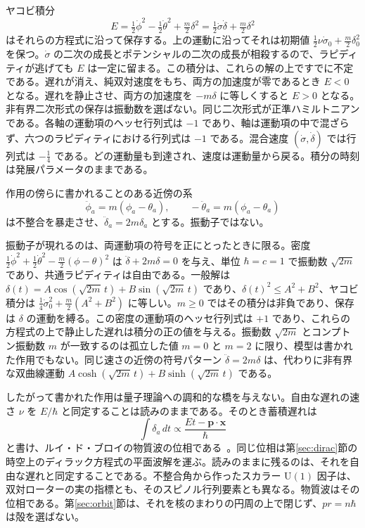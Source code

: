 \documentclass[a4paper]{article}
\begin{document}
ヤコビ積分
\[
E=\tfrac12\dot\phi^2-\tfrac12\dot\theta^2+\tfrac m2\delta^2
=\tfrac12\dot\sigma\dot\delta+\tfrac m2\delta^2
\]
はそれらの方程式に沿って保存する。上の運動に沿ってそれは初期値 $\tfrac12\nu\dot\sigma_0+\tfrac m2\delta_0^2$ を保つ。$\dot\sigma$ の二次の成長とポテンシャルの二次の成長が相殺するので、ラピディティが逃げても $E$ は一定に留まる。この積分は、これらの解の上ですでに不定である。遅れが消え、純双対速度をもち、両方の加速度が零であるとき $E<0$ となる。遅れを静止させ、両方の加速度を $-m\delta$ に等しくすると $E>0$ となる。非有界二次形式の保存は振動数を選ばない。同じ二次形式が正準ハミルトニアンである。各軸の運動項のヘッセ行列式は $-1$ であり、軸は運動項の中で混ざらず、六つのラピディティにおける行列式は $-1$ である。混合速度 $(\dot\sigma,\dot\delta)$ では行列式は $-\tfrac14$ である。どの運動量も到達され、速度は運動量から戻る。積分の時刻は発展パラメータのままである。

作用の傍らに書かれることのある近傍の系
\[
\ddot{\phi}_a = m (\phi_a - \theta_a), \qquad -\ddot{\theta}_a = m (\phi_a - \theta_a)
\]
は不整合を暴走させ、$\ddot\delta_a=2m\delta_a$ とする。振動子ではない。

振動子が現れるのは、両運動項の符号を正にとったときに限る。密度 $\tfrac12\dot\phi^2+\tfrac12\dot\theta^2-\tfrac m2(\phi-\theta)^2$ は $\ddot\delta+2m\delta=0$ を与え、単位 $\hbar=c=1$ で振動数 $\sqrt{2m}$ であり、共通ラピディティは自由である。一般解は $\delta(t)=A\cos(\sqrt{2m}\,t)+B\sin(\sqrt{2m}\,t)$ であり、$\delta(t)^2\le A^2+B^2$、ヤコビ積分は $\tfrac14\dot\sigma_0^2+\tfrac m2(A^2+B^2)$ に等しい。$m\ge 0$ ではその積分は非負であり、保存は $\delta$ の運動を縛る。この密度の運動項のヘッセ行列式は $+1$ であり、これらの方程式の上で静止した遅れは積分の正の値を与える。振動数 $\sqrt{2m}$ とコンプトン振動数 $m$ が一致するのは孤立した値 $m=0$ と $m=2$ に限り、模型は書かれた作用でもない。同じ速さの近傍の符号パターン $\ddot\delta=2m\delta$ は、代わりに非有界な双曲線運動 $A\cosh(\sqrt{2m}\,t)+B\sinh(\sqrt{2m}\,t)$ である。

したがって書かれた作用は量子理論への調和的な橋を与えない。自由な遅れの速さ $\nu$ を $E/\hbar$ と同定することは読みのままである。そのとき蓄積遅れは
\[
\int \delta_a \, dt \propto \frac{E t - \mathbf{p} \cdot \mathbf{x}}{\hbar}
\]
と書け、ルイ・ド・ブロイの物質波の位相である~\cite{dst-debroglie}。同じ位相は第\ref{sec:dirac}節の時空上のディラック方程式の平面波解を運ぶ。読みのままに残るのは、それを自由な遅れと同定することである。不整合角から作ったスカラー $\mathrm{U}(1)$ 因子は、双対ローターの実の指標とも、そのスピノル行列要素とも異なる。物質波はその位相である。第\ref{sec:orbit}節は、それを核のまわりの円周の上で閉じず、\(pr=n\hbar\) は殻を選ばない。
\end{document}
